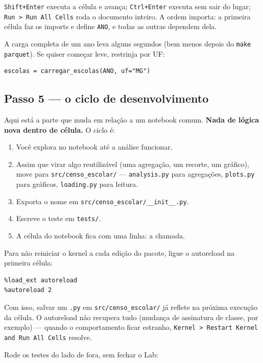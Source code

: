 \documentclass[11pt]{article}
\begin{document}
\texttt{Shift+Enter} executa a célula e avança; \texttt{Ctrl+Enter} executa sem sair do lugar;
\texttt{Run > Run All Cells} roda o documento inteiro. A ordem importa: a primeira
célula faz os imports e define \texttt{ANO}, e todas as outras dependem dela.

A carga completa de um ano leva alguns segundos (bem menos depois do
\texttt{make parquet}). Se quiser começar leve, restrinja por UF:

\begin{verbatim}
escolas = carregar_escolas(ANO, uf="MG")
\end{verbatim}
\subsection*{Passo 5 — o ciclo de desenvolvimento}
\label{sec:orgbec287a}

Aqui está a parte que muda em relação a um notebook comum. \textbf{Nada de lógica nova
dentro de célula.} O ciclo é:

\begin{enumerate}
\item Você explora no notebook até a análise funcionar.
\item Assim que virar algo reutilizável (uma agregação, um recorte, um gráfico),
move para \texttt{src/censo\_escolar/} — \texttt{analysis.py} para agregações, \texttt{plots.py}
para gráficos, \texttt{loading.py} para leitura.
\item Exporta o nome em \texttt{src/censo\_escolar/\_\_init\_\_.py}.
\item Escreve o teste em \texttt{tests/}.
\item A célula do notebook fica com uma linha: a chamada.
\end{enumerate}

Para não reiniciar o kernel a cada edição do pacote, ligue o autoreload na
primeira célula:

\begin{verbatim}
%load_ext autoreload
%autoreload 2
\end{verbatim}

Com isso, salvar um \texttt{.py} em \texttt{src/censo\_escolar/} já reflete na próxima
execução da célula. O autoreload não recupera tudo (mudança de assinatura de
classe, por exemplo) — quando o comportamento ficar estranho, \texttt{Kernel > Restart
Kernel and Run All Cells} resolve.

Rode os testes do lado de fora, sem fechar o Lab:
\end{document}
